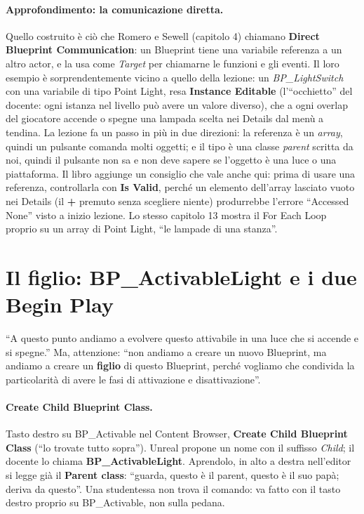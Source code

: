 \paragraph{Approfondimento: la comunicazione diretta.} Quello costruito è ciò che Romero
e Sewell (capitolo 4) chiamano \textbf{Direct Blueprint Communication}: un Blueprint
tiene una variabile referenza a un altro actor, e la usa come \emph{Target} per
chiamarne le funzioni e gli eventi. Il loro esempio è sorprendentemente vicino a quello
della lezione: un \emph{BP\_LightSwitch} con una variabile di tipo Point Light, resa
\textbf{Instance Editable} (l'``occhietto'' del docente: ogni istanza nel livello può
avere un valore diverso), che a ogni overlap del giocatore accende o spegne una lampada
scelta nei Details dal menù a tendina. La lezione fa un passo in più in due direzioni:
la referenza è un \emph{array}, quindi un pulsante comanda molti oggetti; e il tipo è una
classe \emph{parent} scritta da noi, quindi il pulsante non sa e non deve sapere se
l'oggetto è una luce o una piattaforma. Il libro aggiunge un consiglio che vale anche
qui: prima di usare una referenza, controllarla con \textbf{Is Valid}, perché un elemento
dell'array lasciato vuoto nei Details (il \textbf{+} premuto senza scegliere niente)
produrrebbe l'errore ``Accessed None'' visto a inizio lezione. Lo stesso capitolo 13
mostra il For Each Loop proprio su un array di Point Light, ``le lampade di una
stanza''.

\section{Il figlio: BP\_ActivableLight e i due Begin Play}
\label{ue7:sec:child}

``A questo punto andiamo a evolvere questo attivabile in una luce che si accende e si
spegne.'' Ma, attenzione: ``non andiamo a creare un nuovo Blueprint, ma andiamo a creare
un \textbf{figlio} di questo Blueprint, perché vogliamo che condivida la particolarità di
avere le fasi di attivazione e disattivazione''.

\paragraph{Create Child Blueprint Class.} Tasto destro su BP\_Activable nel Content
Browser, \textbf{Create Child Blueprint Class} (``lo trovate tutto sopra''). Unreal
propone un nome con il suffisso \emph{Child}; il docente lo chiama
\textbf{BP\_ActivableLight}. Aprendolo, in alto a destra nell'editor si legge già il
\textbf{Parent class}: ``guarda, questo è il parent, questo è il suo papà; deriva da
questo''. Una studentessa non trova il comando: va fatto con il tasto destro proprio su
BP\_Activable, non sulla pedana.

